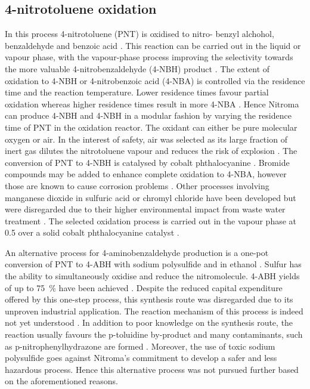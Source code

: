 \subsection{4-nitrotoluene oxidation}

In this process 4-nitrotoluene (PNT) is oxidised to nitro- benzyl alchohol, benzaldehyde and benzoic acid \cite{hoorn_modelling_2005}. This reaction can be carried out in the liquid or vapour phase, with the vapour-phase process improving the selectivity towards the more valuable 4-nitrobenzaldehyde (4-NBH) product \cite{bruhne_benzaldehyde_2011}. The extent of oxidation to 4-NBH or 4-nitrobenzoic acid (4-NBA) is controlled via the residence time and the reaction temperature. Lower residence times favour partial oxidation whereas higher residence times result in more 4-NBA \cite{bruhne_benzaldehyde_2011,tan_kinetic_2010}. Hence Nitroma can produce 4-NBH and 4-NBH in a modular fashion by varying the residence time of PNT in the oxidation reactor. The oxidant can either be pure molecular oxygen or air. In the interest of safety, air was selected as its large fraction of inert  gas dilutes the nitrotoluene vapour and reduces the risk of explosion \cite{bruhne_benzaldehyde_2011}.  The conversion of PNT to 4-NBH is catalysed by cobalt phthalocyanine \cite{wendt_reaction_1986}. Bromide compounds may be added to enhance complete oxidation to 4-NBA, however those are known to cause corrosion problems \cite{opgrande_benzoic_2003}. Other processes involving manganese dioxide in sulfuric acid or chromyl chloride have been developed but were disregarded due to their higher environmental impact from waste water treatment \cite{bruhne_benzaldehyde_2011}. The selected oxidation process is carried out in the vapour phase at \SI{0.5}{\atm} over a solid cobalt phthalocyanine catalyst \cite{chandalia_kinetics_1999}. 

An alternative process for 4-aminobenzaldehyde production is a one-pot conversion of PNT to 4-ABH with sodium polysulfide and  in ethanol \cite{ogata_mechanism_1979}. Sulfur has the ability to simultaneously oxidise and reduce the nitromolecule. 4-ABH yields of up to \SI{75}{\percent} have been achieved \cite{beard_preparation_1944}. Despite the reduced capital expenditure offered by this one-step process, this synthesis route was disregarded due to its unproven industrial application. The reaction mechanism of this process is indeed not yet understood \cite{ogata_mechanism_1979}. In addition to poor knowledge on the synthesis route, the reaction usually favours the p-toluidine by-product and many contaminants, such as p-nitrophenylhydrazone are formed \cite{beard_preparation_1944}. Moreover, the use of toxic sodium polysulfide goes against Nitroma's commitment to develop a safer and less hazardous process. Hence this alternative process was not pursued further based on the aforementioned reasons.

